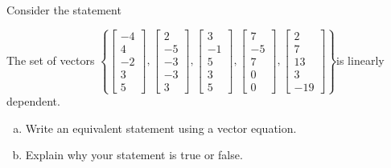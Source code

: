 
\begin{exerciseStatement}


Consider the statement 
\begin{center}\begin{minipage}{0.8\textwidth}
 The set of vectors \( \left\{ \left[\begin{array}{c}
-4 \\
4 \\
-2 \\
3 \\
5
\end{array}\right] , \left[\begin{array}{c}
2 \\
-5 \\
-3 \\
-3 \\
3
\end{array}\right] , \left[\begin{array}{c}
3 \\
-1 \\
5 \\
3 \\
5
\end{array}\right] , \left[\begin{array}{c}
7 \\
-5 \\
7 \\
0 \\
0
\end{array}\right] , \left[\begin{array}{c}
2 \\
7 \\
13 \\
3 \\
-19
\end{array}\right] \right\} \)is linearly dependent.
\end{minipage}\end{center}
    


\begin{enumerate}[(a)]
\item  Write an equivalent statement using a vector equation.
\item  Explain why your statement is true or false.
\end{enumerate}
    
\end{exerciseStatement}
    
